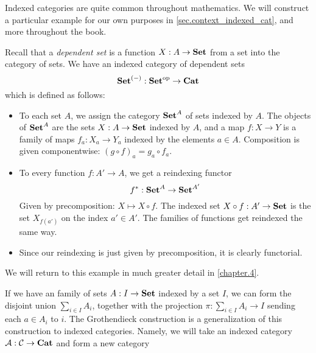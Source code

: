 \documentclass[DynamicalBook]{subfiles}
\begin{document}
Indexed categories are quite common throughout mathematics. We will construct a
particular example for our own purposes in \cref{sec.context_indexed_cat}, and
more throughout the book.

\begin{example}\label{ex.indexed_cat_of_dependent_sets}
  Recall that a \emph{dependent set} is a function $X : A \to \textbf{Set}$ from a set
  into the category of sets. We have an indexed category of dependent sets
  $$\textbf{Set}^{(-)} : \textbf{Set}^{\textnormal{op}} \to \textbf{Cat}$$
  which is defined as follows:
  \begin{itemize}
    \item To each set $A$, we assign the category $\textbf{Set}^A$ of sets indexed by
      $A$. The objects of $\textbf{Set}^A$ are the sets $X : A \to \textbf{Set}$ indexed by
      $A$, and a map $f : X \to Y$ is a family of maps $f_a : X_a \to Y_a$
      indexed by the elements $a \in A$. Composition is given componentwise: $(g
      \circ f)_a = g_a \circ f_a$.
    \item To every function $f : A' \to A$, we get a reindexing functor
$$f^{\ast} : \textbf{Set}^A \to \textbf{Set}^{A'}$$
   Given by precomposition: $X \mapsto X \circ f$. The indexed set $X \circ f :
   A' \to \textbf{Set}$ is the set $X_{f(a')}$ on the index $a' \in A'$. The families
   of functions get reindexed the same way.
     \item Since our reindexing is just given by precomposition, it is clearly
       functorial.
  \end{itemize}
  We will return to this example in much greater detail in \cref{chapter.4}.
\end{example} 


If we have an family of sets $A : I \to \textbf{Set}$ indexed by a set $I$, we can
form the disjoint union $\sum_{i \in I} A_i$, together with the projection $\pi
: \sum_{i \in I} A_i \to I$ sending each $a \in A_i$ to $i$. The Grothendieck
construction is a generalization of this construction to indexed categories. Namely, we will take an indexed category $\mathcal{A}
: \mathcal{C} \to \textbf{Cat}$ and form a new category
\end{document}

